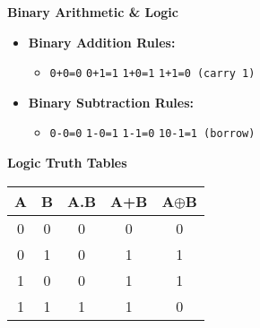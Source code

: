 \documentclass[a4paper, 8pt]{extarticle}
\newcommand{\subsectionheading}[1]{\normalsize\textbf{#1}}
\begin{document}
\begin{multicols}{2}
\subsectionheading{Binary Arithmetic \& Logic}
\begin{itemize}
    \item \textbf{Binary Addition Rules:}
    \begin{itemize}
        \item[] \texttt{0+0=0} \quad \texttt{0+1=1} \quad \texttt{1+0=1} \quad \texttt{1+1=0 (carry 1)}
    \end{itemize}
    \item \textbf{Binary Subtraction Rules:}
    \begin{itemize}
        \item[] \texttt{0-0=0} \quad \texttt{1-0=1} \quad \texttt{1-1=0} \quad \texttt{10-1=1 (borrow)}
    \end{itemize}
\end{itemize}
\subsectionheading{Logic Truth Tables}
\begin{center}
\begin{tabular}{|c|c|c|c|c|}
    \hline
    \textbf{A} & \textbf{B} & \textbf{A.B} & \textbf{A+B} & \textbf{A$\oplus$B} \\
    \hline
    0 & 0 & 0 & 0 & 0 \\
    0 & 1 & 0 & 1 & 1 \\
    1 & 0 & 0 & 1 & 1 \\
    1 & 1 & 1 & 1 & 0 \\
    \hline
\end{tabular}
\end{center}

\end{multicols}
\end{document}
